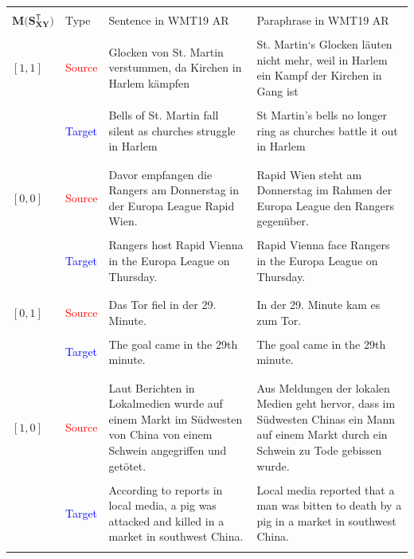 \documentclass[11pt,a4paper]{article}
\begin{document}
\begin{table}[t!]
  \centering
  \begin{tabular*}{\textwidth}{ll p{5.9cm} p{5.9cm}}
    \hline \\[-10pt]
    $\mathbf{M(S_{XY}^{\mathsf{T}}})$ & Type & Sentence in WMT19 AR & Paraphrase in WMT19 AR \\[5pt]
    \hline \hline \\[-10pt]
    $[1,1]$ & \textcolor{red}{Source} & Glocken von St. Martin verstummen, da Kirchen in Harlem kämpfen &  St. Martin‘s Glocken läuten nicht mehr, weil in Harlem ein Kampf der Kirchen in Gang ist \\\\[-5pt]
                                      & \textcolor{blue}{Target} & Bells of St. Martin fall silent as churches struggle in Harlem & St Martin's bells no longer ring as churches battle it out in Harlem \\\\[-10pt]
    \hline \\[-10pt]
    $[0,0]$ & \textcolor{red}{Source} & Davor empfangen die Rangers am Donnerstag in der Europa League Rapid Wien. & Rapid Wien steht am Donnerstag im Rahmen der Europa League den Rangers gegenüber. \\\\[-5pt]
                                      & \textcolor{blue}{Target} & Rangers host Rapid Vienna in the Europa League on Thursday. & Rapid Vienna face Rangers in the Europa League on Thursday. \\\\[-10pt]
    \hline \\[-10pt]
    $[0,1]$ & \textcolor{red}{Source} & Das Tor fiel in der 29. Minute. & In der 29. Minute kam es zum Tor. \\\\[-5pt]
                                      & \textcolor{blue}{Target} & The goal came in the 29th minute. & The goal came in the 29th minute. \\\\[-10pt]
    \hline \\[-10pt]
    $[1,0]$ & \textcolor{red}{Source} & Laut Berichten in Lokalmedien wurde auf einem Markt im Südwesten von China von einem Schwein angegriffen und getötet. & Aus Meldungen der lokalen Medien geht hervor, dass im Südwesten Chinas ein Mann auf einem Markt durch ein Schwein zu Tode gebissen wurde.  \\\\[-5pt]
                                      & \textcolor{blue}{Target} & According to reports in local media, a pig was attacked and killed in a market in southwest China. & Local media reported that a man was bitten to death by a pig in a market in southwest China. \\\\[-10pt]

\end{tabular*}
\end{table}
\end{document}
